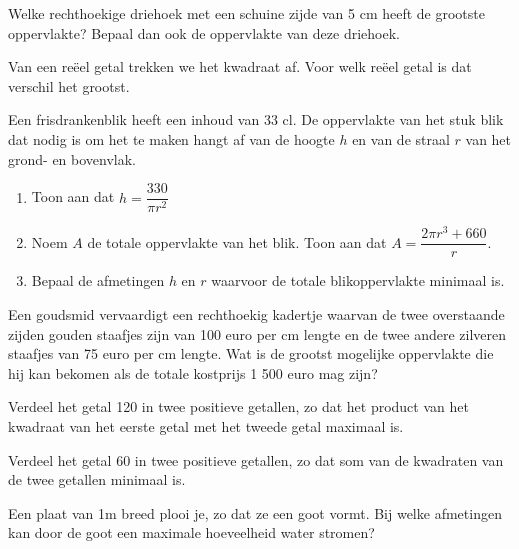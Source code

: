 \documentclass[12pt]{article}
\begin{document}
\begin{oefening}
  Welke rechthoekige driehoek met een schuine zijde van 5 cm heeft de grootste
  oppervlakte? Bepaal dan ook de oppervlakte van deze driehoek.
\end{oefening}

\begin{oefening}
  Van een reëel getal trekken we het kwadraat af. Voor welk reëel getal is dat verschil het grootst.
\end{oefening}

\begin{oefening}
  Een frisdrankenblik heeft een inhoud van 33 cl. De oppervlakte van het stuk blik dat
  nodig is om het te maken hangt af van de hoogte $h$ en van de straal $r$ van het grond- en
  bovenvlak.
  \begin{enumerate}
  \item Toon aan dat $h=\dfrac{330}{\pi r^2}$
  \item Noem $A$ de totale oppervlakte van het blik. Toon aan dat $A=\dfrac{2\pi r^3 + 660}{r}$.
  \item Bepaal de afmetingen $h$ en $r$ waarvoor de totale blikoppervlakte minimaal is.
  \end{enumerate}
\end{oefening}

\begin{oefening}
  Een goudsmid vervaardigt een rechthoekig kadertje waarvan de twee overstaande
  zijden gouden staafjes zijn van 100 euro per cm lengte en de twee andere zilveren staafjes
  van 75 euro per cm lengte. Wat is de grootst mogelijke oppervlakte die hij kan bekomen
  als de totale kostprijs 1 500 euro mag zijn?
\end{oefening}

\begin{oefening}
  Verdeel het getal 120 in twee positieve getallen,
  zo dat het product van het kwadraat van het eerste getal met het tweede getal maximaal is.
\end{oefening}

\begin{oefening}
  Verdeel het getal 60 in twee positieve getallen,
  zo dat som van de kwadraten van de twee getallen minimaal is.
\end{oefening}

\begin{oefening}
  Een plaat van 1m breed plooi je, zo dat ze een goot vormt.
  Bij welke afmetingen kan door de goot een maximale hoeveelheid water stromen?
\end{oefening}
\end{document}
